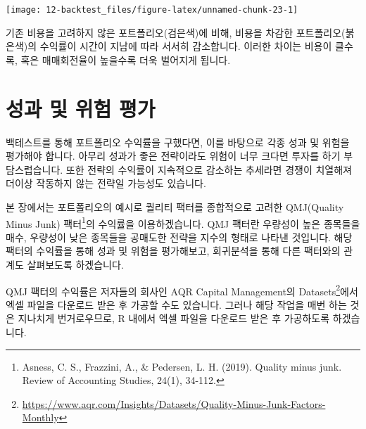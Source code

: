 \documentclass[12pt,]{book}
\newenvironment{Shaded}{\begin{snugshade}}{\end{snugshade}}
\newcommand{\DataTypeTok}[1]{\textcolor[rgb]{0.13,0.29,0.53}{#1}}
\newcommand{\KeywordTok}[1]{\textcolor[rgb]{0.13,0.29,0.53}{\textbf{#1}}}
\newcommand{\NormalTok}[1]{#1}
\newcommand{\OperatorTok}[1]{\textcolor[rgb]{0.81,0.36,0.00}{\textbf{#1}}}
\newcommand{\StringTok}[1]{\textcolor[rgb]{0.31,0.60,0.02}{#1}}
\let\rmarkdownfootnote\footnote%
\def\footnote{\protect\rmarkdownfootnote}
\begin{document}
\begin{Shaded}
\end{Shaded}

\begin{center}\texttt{[image: 12-backtest\_files/figure-latex/unnamed-chunk-23-1]} \end{center}

기존 비용을 고려하지 않은 포트폴리오(검은색)에 비해, 비용을 차감한 포트폴리오(붉은색)의 수익률이 시간이 지남에 따라 서서히 감소합니다. 이러한 차이는 비용이 클수록, 혹은 매매회전율이 높을수록 더욱 벌어지게 됩니다.

\hypertarget{section-85}{%
\chapter{성과 및 위험 평가}\label{section-85}}

백테스트를 통해 포트폴리오 수익률을 구했다면, 이를 바탕으로 각종 성과 및 위험을 평가해야 합니다. 아무리 성과가 좋은 전략이라도 위험이 너무 크다면 투자를 하기 부담스럽습니다. 또한 전략의 수익률이 지속적으로 감소하는 추세라면 경쟁이 치열해져 더이상 작동하지 않는 전략일 가능성도 있습니다.

본 장에서는 포트폴리오의 예시로 퀄리티 팩터를 종합적으로 고려한 QMJ(Quality Minus Junk) 팩터\footnote{Asness, C. S., Frazzini, A., \& Pedersen, L. H. (2019). Quality minus junk. Review of Accounting Studies, 24(1), 34-112.}의 수익률을 이용하겠습니다. QMJ 팩터란 우량성이 높은 종목들을 매수, 우량성이 낮은 종목들을 공매도한 전략을 지수의 형태로 나타낸 것입니다. 해당 팩터의 수익률을 통해 성과 및 위험을 평가해보고, 회귀분석을 통해 다른 팩터와의 관계도 살펴보도록 하겠습니다.

QMJ 팩터의 수익률은 저자들의 회사인 AQR Capital Management의 Datasets\footnote{\url{https://www.aqr.com/Insights/Datasets/Quality-Minus-Junk-Factors-Monthly}}에서 엑셀 파일을 다운로드 받은 후 가공할 수도 있습니다. 그러나 해당 작업을 매번 하는 것은 지나치게 번거로우므로, R 내에서 엑셀 파일을 다운로드 받은 후 가공하도록 하겠습니다.
\end{document}
